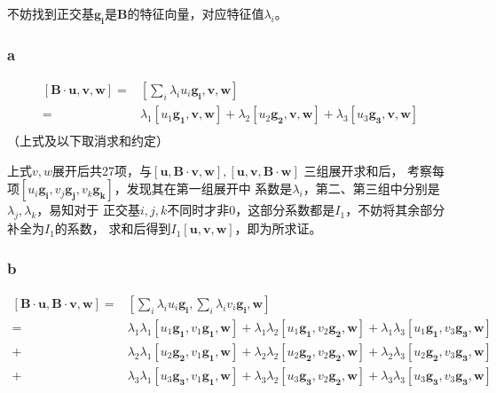 \documentclass[UTF8,zihao=5]{ctexart}
\begin{document}
不妨找到正交基$\bm{g_i}$是$\bm{B}$的特征向量，对应特征值$\lambda_i$。

\subsubsection*{a}

\begin{equation*}
    \begin{split}
        \bm{[B\cdot u,v,w]}
        =&\left[\sum_i{\lambda_iu_i\bm{g_i}},\bm{v},\bm{w}\right]\\
        =&\lambda_1[u_1\bm{g_1,v,w}]
            +\lambda_2[u_2\bm{g_2,v,w}]
            +\lambda_3[u_3\bm{g_3,v,w}]\\
    \end{split}
\end{equation*}
（上式及以下取消求和约定）

上式$v,w$展开后共27项，与$\bm{[u,B\cdot v,w]},\bm{[u,v,B\cdot w]}$
三组展开求和后，
考察每项$[u_i\bm{g_i},v_j\bm{g_j},v_k\bm{g_k}]$，发现其在第一组展开中
系数是$\lambda_i$，第二、第三组中分别是$\lambda_j,\lambda_k$，易知对于
正交基$i,j,k$不同时才非0，这部分系数都是$I_1$，不妨将其余部分补全为$I_1$的系数，
求和后得到$I_1[\bm{u},\bm{v},\bm{w}]$，即为所求证。

\subsubsection*{b}

\begin{equation*}
    \begin{split}
        \bm{[B\cdot u,B\cdot v,w]}
        =&\left[\sum_i{\lambda_iu_i\bm{g_i}},\sum_i{\lambda_iv_i\bm{g_i}},\bm{w}\right]\\
        =
        &\lambda_1\lambda_1[u_1\bm{g_1},v_1\bm{g_1,w}]
        +\lambda_1\lambda_2[u_1\bm{g_1},v_2\bm{g_2,w}]
        +\lambda_1\lambda_3[u_1\bm{g_1},v_3\bm{g_3,w}]\\+
        &\lambda_2\lambda_1[u_2\bm{g_2},v_1\bm{g_1,w}]
        +\lambda_2\lambda_2[u_2\bm{g_2},v_2\bm{g_2,w}]
        +\lambda_2\lambda_3[u_2\bm{g_2},v_3\bm{g_3,w}]\\+
        &\lambda_3\lambda_1[u_3\bm{g_3},v_1\bm{g_1,w}]
        +\lambda_3\lambda_2[u_3\bm{g_3},v_2\bm{g_2,w}]
        +\lambda_3\lambda_3[u_3\bm{g_3},v_3\bm{g_3,w}]\\
    \end{split}
\end{equation*}
\end{document}
